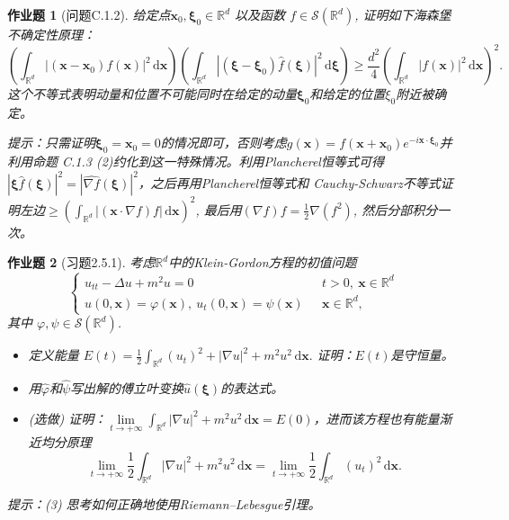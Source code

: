 \documentclass[UTF8,fontset=windows,12pt]{ctexart}
\theoremstyle{kaiti-theorem}
\newtheorem{problem}{作业题}
\numberwithin{equation}{section}
\newcommand{\R}{\mathbb{R}}
\newcommand{\bds}[1]{\boldsymbol{#1}}  %
\newcommand{\sh}{\mathcal{S}}
\newcommand{\p}{\partial}
\newcommand{\lap}{\Delta}
\newcommand{\nab}{\nabla}
\newcommand{\dx}{\,\mathrm{d}x}
\newcommand{\dxx}{\,\mathrm{d}\bds{x}}
\newcommand{\xxi}{\boldsymbol{\xi}}
\newcommand{\dxxi}{\,\mathrm{d}\boldsymbol{\xi}}
\newcommand{\ird}{\int_{\R^d}}
\newcommand{\xx}{{\bds{x}}}
\begin{document}
\begin{problem}[问题C.1.2]
给定点$\xx_0,\xxi_0\in \R^d$ 以及函数 $f\in\mathcal{S}(\R^d)$, 证明如下海森堡不确定性原理：
\begin{equation}
\left(\ird |(\xx-\xx_0)f(\xx)|^2\dxx\right)\left(\ird |(\xxi-\xxi_0)\hat{f}(\xxi)|^2\dxxi\right)\geqslant \frac{d^2}{4} \left(\ird |f(\xx)|^2\dxx\right)^2.
\end{equation} 这个不等式表明动量和位置不可能同时在给定的动量$\xxi_0$和给定的位置$\xi_0$附近被确定。

提示：只需证明$\xxi_0=\xx_0=0$的情况即可，否则考虑$g(\xx)=f(\xx+\xx_0)e^{-i\xx\cdot\xxi_0}$并利用命题 C.1.3 (2)约化到这一特殊情况。利用Plancherel恒等式可得 $|\xxi\hat{f}(\xxi)|^2=|\widehat{\nab f}(\xxi)|^2$，之后再用Plancherel恒等式和 Cauchy-Schwarz不等式证明左边$\geqslant (\ird |(\xx\cdot\nab f)f|\dxx)^2$, 最后用$(\nab f)f=\frac12 \nab(f^2)$, 然后分部积分一次。
\end{problem}


\begin{problem}[习题2.5.1]
考虑$\R^d$中的Klein-Gordon方程的初值问题
\begin{equation*}
\begin{cases}
u_{tt}-\lap u+m^2 u=0~~~&t>0,~\xx\in\R^d\\
u(0,\xx)=\varphi(\xx),~u_t(0,\xx)=\psi(\xx)~~~&\xx\in\R^d,
\end{cases}
\end{equation*}其中 $\varphi,\psi\in\mathcal{S}(\R^d)$.
\begin{itemize}
\item [(1)] 定义能量 $E(t)=\frac12\int_{\R^d}(u_t)^2+|\nab u|^2+m^2 u^2\dxx.$ 证明：$E(t)$是守恒量。
\item [(2)] 用$\hat{\varphi}$和$\hat{\psi}$写出解的傅立叶变换$\hat{u}(\xxi)$的表达式。
\item [(3)] (选做) 证明：$\lim\limits_{t\to+\infty}\int_{\R^d}|\nab u|^2+m^2u^2\dxx=E(0)$，进而该方程也有能量渐近均分原理$$\lim\limits_{t\to+\infty}\frac12\int_{\R^d}|\nab u|^2+m^2u^2\dxx=\lim\limits_{t\to+\infty}\frac12\int_{\R^d}(u_t)^2\dxx.$$
\end{itemize}

提示：(3) 思考如何正确地使用Riemann--Lebesgue引理。
\end{problem}
%
%
\end{document}
